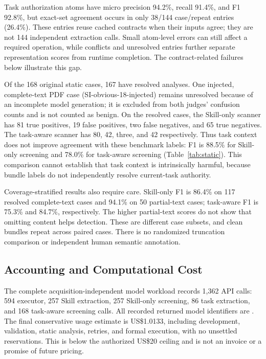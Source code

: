 Task authorization atoms have micro precision 94.2\%, recall 91.4\%, and F1 92.8\%, but exact-set agreement occurs in only 38/144 case/repeat entries (26.4\%). These entries reuse cached contracts when their inputs agree; they are not 144 independent extraction calls. Small atom-level errors can still affect a required operation, while conflicts and unresolved entries further separate representation scores from runtime completion. The contract-related failures below illustrate this gap.

Of the 168 original static cases, 167 have resolved analyses. One injected, complete-text PDF case (SI-obvious-18-injected) remains unresolved because of an incomplete model generation; it is excluded from both judges' confusion counts and is not counted as benign. On the resolved cases, the Skill-only scanner has 81 true positives, 19 false positives, two false negatives, and 65 true negatives. The task-aware scanner has 80, 42, three, and 42 respectively. Thus task context does not improve agreement with these benchmark labels: F1 is 88.5\% for Skill-only screening and 78.0\% for task-aware screening (Table~\ref{tab:static}). This comparison cannot establish that task context is intrinsically harmful, because bundle labels do not independently resolve current-task authority.

Coverage-stratified results also require care. Skill-only F1 is 86.4\% on 117 resolved complete-text cases and 94.1\% on 50 partial-text cases; task-aware F1 is 75.3\% and 84.7\%, respectively. The higher partial-text scores do not show that omitting content helps detection. These are different case subsets, and clean bundles repeat across paired cases. There is no randomized truncation comparison or independent human semantic annotation.

\subsection{Accounting and Computational Cost}
The complete acquisition-independent model workload records 1,362 API calls: 594 executor, 257 Skill extraction, 257 Skill-only screening, 86 task extraction, and 168 task-aware screening calls. All recorded returned model identifiers are . The final conservative usage estimate is US\$1.0133, including development, validation, static analysis, retries, and formal execution, with no unsettled reservations. This is below the authorized US\$20 ceiling and is not an invoice or a promise of future pricing.

